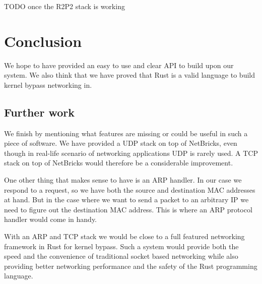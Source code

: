 \documentclass[11pt]{article}
\begin{document}
TODO once the R2P2 stack is working

\section{Conclusion}

We hope to have provided an easy to use and clear API to build upon
our system. We also think that we have proved that Rust is a valid
language to build kernel bypass networking in.

\subsection{Further work}

We finish by mentioning what features are missing or could be useful
in such a piece of software. We have provided a UDP stack on top of
NetBricks, even though in real-life scenario of networking
applications UDP is rarely used. A TCP stack on top of NetBricks would
therefore be a considerable improvement.

One other thing that makes sense to have is an ARP handler. In our
case we respond to a request, so we have both the source and
destination MAC addresses at hand. But in the case where we want to
send a packet to an arbitrary IP we need to figure out the destination
MAC address. This is where an ARP protocol handler would come in
handy.

With an ARP and TCP stack we would be close to a full featured
networking framework in Rust for kernel bypass. Such a system would
provide both the speed and the convenience of traditional socket based
networking while also providing better networking performance and the
safety of the Rust programming language.
\end{document}
